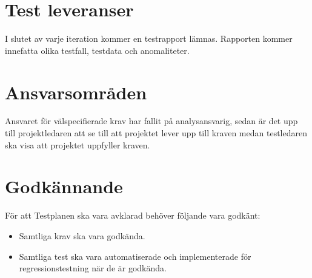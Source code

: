 \section{Test leveranser}
	I slutet av varje iteration kommer en testrapport lämnas. Rapporten kommer innefatta olika testfall, testdata och anomaliteter.




\section{Ansvarsområden}
	Ansvaret för välspecifierade krav har fallit på analysansvarig, sedan är det upp till projektledaren att se till att projektet lever upp till kraven medan testledaren ska visa att projektet uppfyller kraven.





\section{Godkännande}
	För att Testplanen ska vara avklarad behöver följande vara godkänt:
	\begin{itemize}
	 \item Samtliga krav ska vara godkända.
	\item Samtliga test ska vara automatiserade och implementerade för regressionstestning när de är godkända.

	\end{itemize}




\printbibliography



